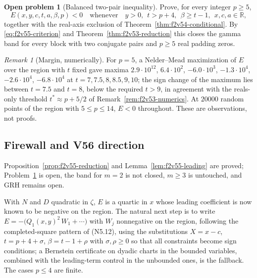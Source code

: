\documentclass[11pt]{article}
\theoremstyle{definition}
\newtheorem{problem}[theorem]{Open problem}
\theoremstyle{remark}
\newtheorem{remark}[theorem]{Remark}
\begin{document}
\begin{problem}[Balanced two-pair inequality]
\label{prob:f2v55-target}
Prove, for every integer \(p\ge5\),
\begin{equation}
 E(x,y,c,t,a,\beta,p)<0\quad\text{whenever}\quad
 y>0,\ \ t>p+4,\ \ \beta\ge t-1,\ \ x,c,a\in\mathbb R,
 \label{eq:f2v55-target}
\end{equation}
together with the real-axis exclusion of
Theorem~\ref{thm:f2v54-conditional}.  By \eqref{eq:f2v55-criterion} and
Theorem~\ref{thm:f2v53-reduction} this closes the gamma band for every
block with two conjugate pairs and \(p\ge5\) real padding zeros.
\end{problem}

\begin{remark}[Margin, numerically]
\label{rem:f2v55-numerics}
For \(p=5\), a Nelder--Mead maximization of \(E\) over the region with
\(t\) fixed gave maxima \(2.9\cdot10^{12}\), \(6.4\cdot10^2\),
\(-6.0\cdot10^3\), \(-1.3\cdot10^4\), \(-2.6\cdot10^4\), \(-6.8\cdot10^4\)
at \(t=7,7.5,8,8.5,9,10\); the sign change of the maximum lies between
\(t=7.5\) and \(t=8\), below the required \(t>9\), in agreement with the
reals-only threshold \(t^*\approx p+5/2\) of
Remark~\ref{rem:f2v53-numerics}.  At \(20000\) random points of the
region with \(5\le p\le14\), \(E<0\) throughout.  These are
observations, not proofs.
\end{remark}

\subsection*{Firewall and V56 direction}
\label{fire:f2v55}
Proposition~\ref{prop:f2v55-reduction} and Lemma~\ref{lem:f2v55-leading}
are proved; Problem~\ref{prob:f2v55-target} is open, the band for
\(m=2\) is not closed, \(m\ge3\) is untouched, and GRH remains open.

With \(N\) and \(D\) quadratic in \(\zeta\), \(E\) is a quartic in \(x\)
whose leading coefficient is now known to be negative on the region.  The
natural next step is to write \(E=-\bigl(Q_1(x,y)^2\,W_1+\cdots\bigr)\)
with \(W_j\) nonnegative on the region, following the completed-square
pattern of \textup{(N5.12)}, using the substitutions \(X=x-c\),
\(t=p+4+\sigma\), \(\beta=t-1+\rho\) with \(\sigma,\rho\ge0\) so that
all constraints become sign conditions; a Bernstein certificate on
dyadic charts in the bounded variables, combined with the leading-term
control in the unbounded ones, is the fallback.  The cases \(p\le4\) are
finite.
\end{document}
